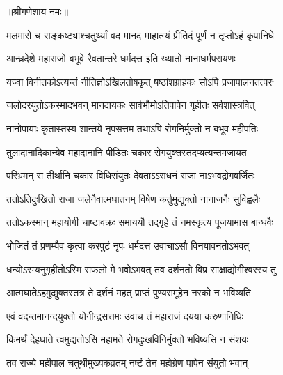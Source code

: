 \label{sec:malamasa-krishna-chaturthi-mahatmya-varnanam}

\centerline{॥श्रीगणेशाय नमः॥}


\twolineshloka
{मलमासे च सङ्कष्ट्याश्चतुर्थ्यां वद मानद}
{माहात्म्यं प्रीतिदं पूर्णं न तृप्तोऽहं कृपानिधे} %


\twolineshloka
{आन्ध्रदेशे महाराजो बभूवे रैवतान्तरे}
{धर्मदत्त इति ख्यातो नानाधर्मपरायणः} %

\twolineshloka
{यज्वा विनीतकोऽत्यन्तं नीतिज्ञोऽखिलतोषकृत्}
{षष्ठांशग्राहकः सोऽपि प्रजापालनतत्परः} %

\twolineshloka
{जलोदरयुतोऽकस्मादभवन् मानदायकः}
{सार्वभौमोऽतिपापेन गृहीतः सर्वशास्त्रवित्} %

\twolineshloka
{नानोपायाः कृतास्तस्य शान्तये नृपसत्तम}
{तथाऽपि रोगनिर्मुक्तो न बभूव महीपतिः} %

\twolineshloka
{तुलादानादिकान्येव महादानानि पीडितः}
{चकार रोगयुक्तस्तदप्यत्यन्तमजायत} %

\twolineshloka
{परिभ्रमन् स तीर्थानि चकार विधिसंयुतः}
{देवताऽऽराधनं राजा नाऽभवद्रोगवर्जितः} %

\twolineshloka
{ततोऽतिदुःखितो राजा जलेनैवात्मघातनम्}
{विषेण कर्तुमुद्युक्तो नानाजनैः सुविह्वलैः} %

\twolineshloka
{ततोऽकस्मान् महायोगी चाष्टावक्रः समाययौ}
{तद्गृहे तं नमस्कृत्य पूजयामास बान्धवैः} %

\twolineshloka
{भोजितं तं प्रणम्यैव कृत्वा करपुटं नृपः}
{धर्मदत्त उवाचाऽसौ विनयावनतोऽभवत्} %


\twolineshloka
{धन्योऽस्म्यनुगृहीतोऽस्मि सफलो मे भवोऽभवत्}
{तव दर्शनतो विप्र साक्षाद्योगीश्वरस्य तु} %

\twolineshloka
{आत्मघातेऽहमुद्युक्तस्तत्र ते दर्शनं महत्}
{प्राप्तं पुण्यसमूहेन नरको न भविष्यति} %


\twolineshloka
{एवं वदन्तमानन्दयुक्तो योगीन्द्रसत्तमः}
{उवाच तं महाराजं दयया करुणानिधिः} %


\twolineshloka
{किमर्थं देहघाते त्वमुद्यतोऽसि महामते}
{रोगदुःखविनिर्मुक्तो भविष्यसि न संशयः} %

\twolineshloka
{तव राज्ये महीपाल चतुर्थीमुख्यकव्रतम्}
{नष्टं तेन महोग्रेण पापेन संयुतो भवान्} %


